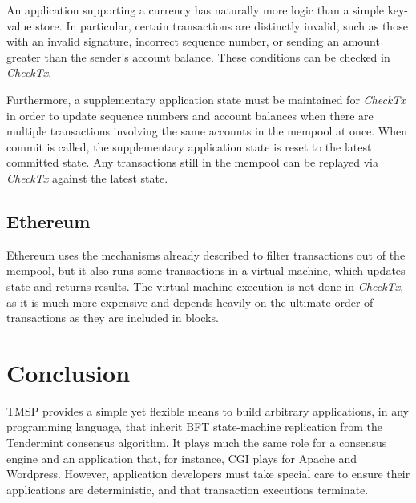 An application supporting a currency has naturally more logic than a simple key-value store.
In particular, certain transactions are distinctly invalid, 
such as those with an invalid signature, incorrect sequence number,
or sending an amount greater than the sender's account balance.
These conditions can be checked in \emph{CheckTx}.

Furthermore, a supplementary application state must be maintained for \emph{CheckTx} 
in order to update sequence numbers and account balances 
when there are multiple transactions involving the same accounts in the mempool at once.
When commit is called, the supplementary application state is reset to the latest committed state.
Any transactions still in the mempool can be replayed via \emph{CheckTx} against the latest state.

\subsection{Ethereum}

Ethereum uses the mechanisms already described to filter transactions out of the mempool,
but it also runs some transactions in a virtual machine, 
which updates state and returns results.
The virtual machine execution is not done in \emph{CheckTx}, 
as it is much more expensive and depends heavily on the ultimate order of transactions as they are included in blocks.

\section{Conclusion}

TMSP provides a simple yet flexible means to build arbitrary applications,
in any programming language,
that inherit BFT state-machine replication from the Tendermint consensus algorithm.
It plays much the same role for a consensus engine and an application that, for instance, CGI plays for Apache and Wordpress.
However, application developers must take special care to ensure their applications are deterministic, and that transaction executions terminate.

